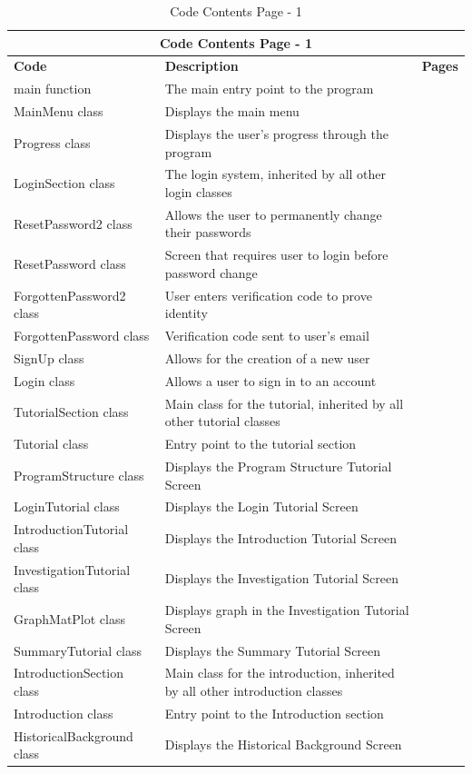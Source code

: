 \documentclass{article}
\begin{document}
\begin{table}[ht]
    \centering
    \begin{tabular}{ | p{0.33\linewidth} | p{0.57\linewidth} | p{0.1\linewidth} |}
    \hline
    \multicolumn{3}{|c|}{\textbf{Code Contents Page - 1}}\\
    \hline
    \hline
    \textbf{Code} & \textbf{Description} & \textbf{Pages}\\
    \hline
    main function & The main entry point to the program & \\
    \hline
    MainMenu class & Displays the main menu & \\
    \hline
    Progress class & Displays the user's progress through the program& \\
    \hline
    LoginSection class & The login system, inherited by all other login classes & \\
    \hline
    ResetPassword2 class & Allows the user to permanently change their passwords & \\
    \hline
    ResetPassword class & Screen that requires user to login before password change & \\
    \hline
    ForgottenPassword2 class & User enters verification code to prove identity & \\
    \hline
    ForgottenPassword class & Verification code sent to user's email & \\
    \hline
    SignUp class & Allows for the creation of a new user & \\
    \hline
    Login class & Allows a user to sign in to an account & \\
    \hline
    TutorialSection class & Main class for the tutorial, inherited by all other tutorial classes & \\
    \hline
    Tutorial class & Entry point to the tutorial section & \\
    \hline
    ProgramStructure class & Displays the Program Structure Tutorial Screen & \\
    \hline
    LoginTutorial class & Displays the Login Tutorial Screen & \\
    \hline
    IntroductionTutorial class & Displays the Introduction Tutorial Screen & \\
    \hline
    InvestigationTutorial class & Displays the Investigation Tutorial Screen & \\
    \hline
    GraphMatPlot class & Displays graph in the Investigation Tutorial Screen & \\
    \hline
    SummaryTutorial class & Displays the Summary Tutorial Screen & \\
    \hline
    IntroductionSection class & Main class for the introduction, inherited by all other introduction classes & \\
    \hline
    Introduction class & Entry point to the Introduction section & \\
    \hline
    HistoricalBackground class & Displays the Historical Background Screen & \\
    \hline
    \end{tabular}
    \caption{Code Contents Page - 1}
\end{table}
\clearpage
\end{document}
